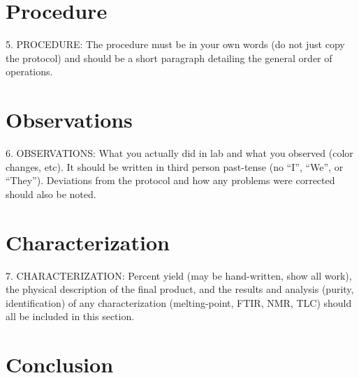 \documentclass[letterpaper,amsmath,amssymb,prb,preprint,12pt]{revtex4-1}%
\begin{document}
\section{Procedure}


5. PROCEDURE: The procedure must be in your own words (do not just copy the
protocol) and should be a short paragraph detailing the general order of operations.

\section{Observations}


6. OBSERVATIONS: What you actually did in lab and what you observed (color
changes, etc). It should be written in third person past-tense (no “I”, “We”, or
“They”). Deviations from the protocol and how any problems were corrected should
also be noted.

\section{Characterization}


7. CHARACTERIZATION: Percent yield (may be hand-written, show all work), the
physical description of the final product, and the results and analysis (purity,
identification) of any characterization (melting-point, FTIR, NMR, TLC) should all
be included in this section.

\section{Conclusion}

\end{document}
